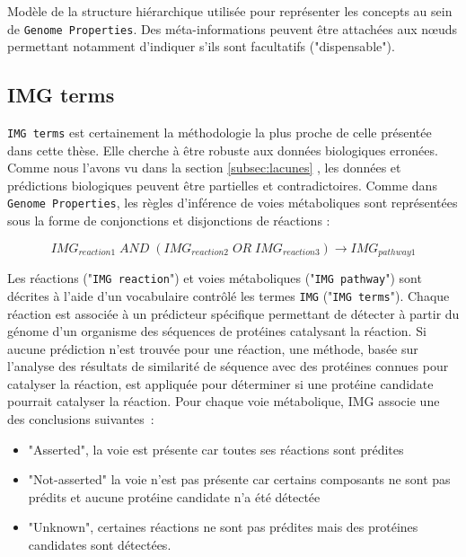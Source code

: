 \begin{refsegment}
\begin{shadedfigure}
\begin{tikzpicture}
            
        \end{tikzpicture}
        \caption{Modèle de la structure hiérarchique utilisée pour représenter les concepts au sein de \texttt{Genome Properties}. Des méta-informations peuvent être attachées aux nœuds permettant notamment d'indiquer s'ils sont facultatifs ("dispensable").  }
        \label{fig:gp_modele}
    \end{shadedfigure}
    
    \subsection{IMG terms}
    
    \texttt{IMG terms} \cite{chen2013improving} est certainement la méthodologie la plus proche de celle présentée dans cette thèse. Elle cherche à être robuste aux données biologiques erronées. Comme nous l'avons vu dans la section \ref{subsec:lacunes} , les données et prédictions biologiques peuvent être partielles et contradictoires. Comme dans \texttt{Genome Properties}, les règles d'inférence de voies métaboliques sont représentées sous la forme de conjonctions et disjonctions de réactions :
    
    \begin{equation}
    IMG_{reaction1} \; AND \; (IMG_{reaction2} \; OR \; IMG_{reaction3} ) \to IMG_{pathway 1}
    \end{equation}
    
    Les réactions ("\texttt{IMG reaction}") et voies métaboliques ("\texttt{IMG pathway}") sont décrites à l'aide d'un vocabulaire contrôlé les termes \texttt{IMG} ("\texttt{IMG terms}"). Chaque réaction est associée à un prédicteur spécifique permettant de détecter à partir du génome d'un organisme des séquences de protéines catalysant la réaction. Si aucune prédiction n'est trouvée pour une réaction, une méthode, basée sur l'analyse des résultats de similarité de séquence avec des protéines connues pour catalyser la réaction, est appliquée pour déterminer si une protéine candidate pourrait catalyser la réaction. Pour chaque voie métabolique, IMG associe une des conclusions suivantes :
    \begin{itemize}
        \item "Asserted", la voie est présente car toutes ses réactions sont prédites
        \item "Not-asserted" la voie n'est pas présente car certains composants ne sont pas prédits et aucune protéine candidate n'a été détectée
        \item "Unknown", certaines réactions ne sont pas prédites mais des protéines candidates sont détectées.
    \end{itemize}


\end{refsegment}
